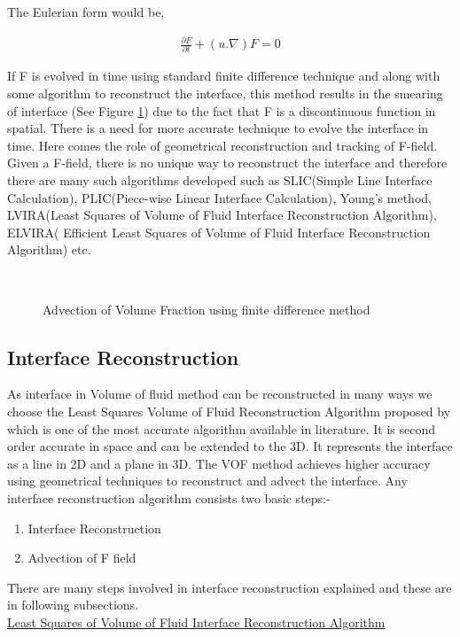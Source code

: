 The Eulerian form would be,

\begin{eqnarray}
 \frac{\partial F}{\partial t}+( u. \nabla)F=0
 \label{Eq:advection_vof}
\end{eqnarray}

If F is evolved in time using standard finite difference technique and along with some algorithm to reconstruct the interface, this method results in the smearing of interface (See
Figure \ref{Fig:smearing}) due to the fact that F is a discontinuous function in spatial. There is a need for more accurate technique to evolve the  interface in time.
Here comes the role of geometrical reconstruction and tracking of F-field. Given a F-field, there is no unique way to reconstruct the interface and therefore there are
many such algorithms developed such as SLIC(Simple Line Interface Calculation), PLIC(Piece-wise Linear Interface Calculation), Young's method, LVIRA(Least Squares of Volume of 
Fluid Interface Reconstruction Algorithm), ELVIRA( Efficient Least Squares of Volume of 
Fluid Interface Reconstruction Algorithm) etc.

\begin{figure}%
 \centering
    \\
 \caption{Advection of Volume Fraction using finite difference method}
 \label{Fig:smearing}
\end{figure}

\subsection{Interface Reconstruction}
As interface in Volume of fluid method can be reconstructed in many ways we choose the Least Squares Volume of 
Fluid Reconstruction Algorithm proposed by \cite{Pilliod2004} which is one of the most accurate algorithm available in literature. It is second order accurate in space 
and can be extended to the 3D. It represents the interface as a line in 2D and a plane in 3D. The VOF method achieves higher accuracy using geometrical techniques to reconstruct
and advect the interface.
Any interface reconstruction algorithm consists two basic steps:-
\begin{enumerate}
 \item Interface Reconstruction
 \item Advection of F field
\end{enumerate}
There are many steps involved in interface reconstruction explained and these are in following subsections.{\vspace{3cm}}\\
\underline{Least Squares of Volume of Fluid Interface Reconstruction Algorithm}
